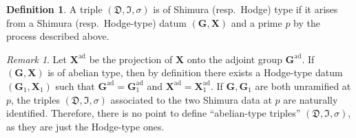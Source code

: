 \documentclass[11pt]{amsart}
\numberwithin{equation}{section}
\theoremstyle{definition}
\newtheorem{definition}[theorem]{Definition}
\theoremstyle{remark}
\newtheorem{rmk}[theorem]{Remark}
\newcommand{\Dfr}{{\mathfrak D}}
\newcommand{\Ifr}{{\mathfrak I}}
\DeclareMathOperator{\ad}{ad}
\newcommand{\gx}{(\mathbf G, \mathbf X)}
\begin{document}
\begin{definition}
A triple $(\Dfr, \Ifr, \sigma)$ is of Shimura (resp.\ Hodge) type if it arises from a Shimura (resp.\ Hodge-type) datum $\gx$ and a prime $p$ by the process described above. 
\end{definition}

\begin{rmk}
Let $\mathbf{X}^{\ad}$ be the projection of $\mathbf{X}$ onto the adjoint group $\mathbf{G}^{\ad}$.
If $\gx$ is of abelian type, then by definition there exists a Hodge-type datum $(\mathbf{G}_1, \mathbf{X}_1)$ such that $\mathbf{G}^{\ad}=\mathbf{G}_1^{\ad}$ and $\mathbf{X}^{\ad}=\mathbf{X}_1^{\ad}$.
If $\mathbf{G}, \mathbf{G}_1$ are both unramified at $p$, the triples $(\Dfr, \Ifr, \sigma)$ associated to the two Shimura data at $p$ are naturally identified. Therefore, there is no point to define ``abelian-type triples'' $(\Dfr, \Ifr, \sigma)$, as they are just the Hodge-type ones.    
\end{rmk}
\end{document}

